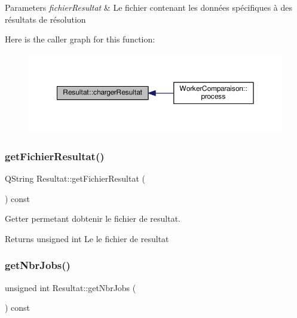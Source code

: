 \begin{DoxyParams}{Parameters}
{\em fichier\+Resultat} & Le fichier contenant les données spécifiques à des résultats de résolution \\
\hline
\end{DoxyParams}
Here is the caller graph for this function\+:\nopagebreak
\begin{figure}[H]
\begin{center}
\leavevmode
\includegraphics[width=350pt]{classResultat_afce37c00573db2aa3f96dd5d69f50d40_icgraph}
\end{center}
\end{figure}
\mbox{\label{classResultat_a77306ef96fc23df3eeea71c986755509}} 
\subsubsection{\texorpdfstring{get\+Fichier\+Resultat()}{getFichierResultat()}}
{\footnotesize\ttfamily Q\+String Resultat\+::get\+Fichier\+Resultat (\begin{DoxyParamCaption}{ }\end{DoxyParamCaption}) const}



Getter permetant d\textquotesingle{}obtenir le fichier de resultat. 

\begin{DoxyReturn}{Returns}
unsigned int Le le fichier de resultat 
\end{DoxyReturn}
\mbox{\label{classResultat_a2bc475be569fa5b75e83401e712fe48c}} 
\subsubsection{\texorpdfstring{get\+Nbr\+Jobs()}{getNbrJobs()}}
{\footnotesize\ttfamily unsigned int Resultat\+::get\+Nbr\+Jobs (\begin{DoxyParamCaption}{ }\end{DoxyParamCaption}) const}



